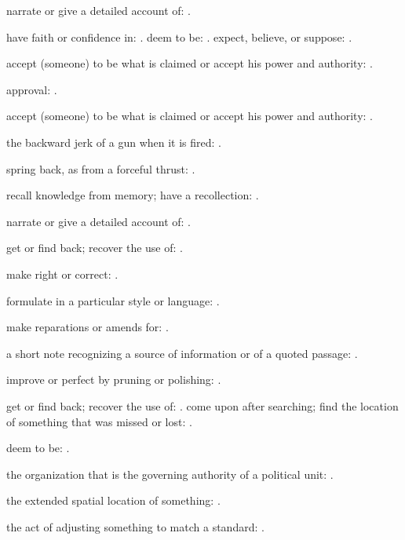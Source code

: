   narrate or give a detailed account of: .

  have faith or confidence in: . deem to be: . expect, believe, or suppose: .

  accept (someone) to be what is claimed or accept his power and authority: .

  approval: .

  accept (someone) to be what is claimed or accept his power and authority: .

  the backward jerk of a gun when it is fired: .

  spring back, as from a forceful thrust: .

  recall knowledge from memory; have a recollection: .

  narrate or give a detailed account of: .

  get or find back; recover the use of: .

  make right or correct: .

  formulate in a particular style or language: .

  make reparations or amends for: .

  a short note recognizing a source of information or of a quoted passage: .

  improve or perfect by pruning or polishing: .

  get or find back; recover the use of: . come upon after searching; find the location of something that was missed or lost: .

  deem to be: .

  the organization that is the governing authority of a political unit: .

  the extended spatial location of something: .

  the act of adjusting something to match a standard: .

